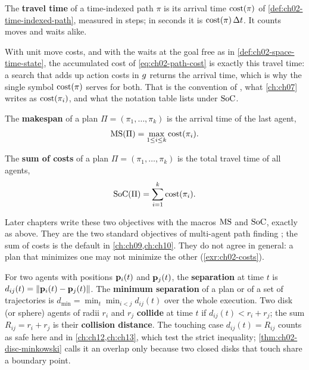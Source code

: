 \begin{definition}
\label{def:ch02-travel-time}
The \textbf{travel time} of a time-indexed path $\pi$ is its arrival time $\operatorname{cost}(\pi)$ of \cref{def:ch02-time-indexed-path}, measured in steps; in seconds it is $\operatorname{cost}(\pi)\,\Delta t$. It counts moves and waits alike.
\end{definition}

With unit move costs, and with the waits at the goal free as in \cref{def:ch02-space-time-state}, the accumulated cost of \cref{eq:ch02-path-cost} is exactly this travel time: a search that adds up action costs in $g$ returns the arrival time, which is why the single symbol $\operatorname{cost}(\pi)$ serves for both. That is the convention of \textcite{stern2019mapf}, what \cref{ch:ch07} writes as $\operatorname{cost}(\pi_i)$, and what the notation table lists under $\mathrm{SoC}$.

\begin{definition}[Makespan]
\label{def:ch02-makespan}
The \textbf{makespan} of a plan $\Pi=(\pi_1,\dots,\pi_k)$ is the arrival time of the last agent,
\begin{equation}
\mathrm{MS}(\Pi)=\max_{1\le i\le k} \operatorname{cost}(\pi_i).
\label{eq:ch02-makespan}
\end{equation}
\end{definition}

\begin{definition}
\label{def:ch02-sum-of-costs}
The \textbf{sum of costs} of a plan $\Pi=(\pi_1,\dots,\pi_k)$ is the total travel time of all agents,
\begin{equation}
\mathrm{SoC}(\Pi)=\sum_{i=1}^{k} \operatorname{cost}(\pi_i).
\label{eq:ch02-sumcost}
\end{equation}
\end{definition}

Later chapters write these two objectives with the macros $\mathrm{MS}$ and $\mathrm{SoC}$, exactly as above. They are the two standard objectives of multi-agent path finding \cite{stern2019mapf}; the sum of costs is the default in \cref{ch:ch09,ch:ch10}. They do not agree in general: a plan that minimizes one may not minimize the other (\cref{exr:ch02-costs}).

\begin{definition}
\label{def:ch02-min-separation}
For two agents with positions $\mathbf{p}_i(t)$ and $\mathbf{p}_j(t)$, the \textbf{separation} at time $t$ is $d_{ij}(t)=\left\lVert \mathbf{p}_i(t)-\mathbf{p}_j(t) \right\rVert$. The \textbf{minimum separation} of a plan or of a set of trajectories is $d_{\min}=\min_{t}\min_{i<j} d_{ij}(t)$ over the whole execution. Two disk (or sphere) agents of radii $r_i$ and $r_j$ \textbf{collide} at time $t$ if $d_{ij}(t)<r_i+r_j$; the sum $R_{ij}=r_i+r_j$ is their \textbf{collision distance}. The touching case $d_{ij}(t)=R_{ij}$ counts as safe here and in \cref{ch:ch12,ch:ch13}, which test the strict inequality; \cref{thm:ch02-disc-minkowski} calls it an overlap only because two closed disks that touch share a boundary point.
\end{definition}

